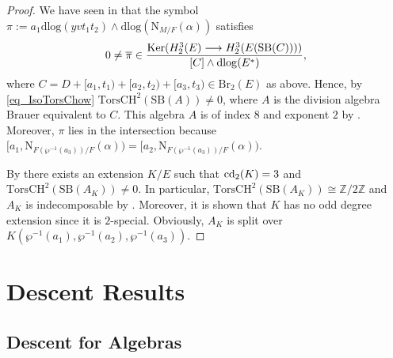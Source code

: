 \documentclass{amsart}
\newtheorem{proposition}[definition]{Proposition}
\numberwithin{equation}{section}
\newcommand{\Z}{\mathbb{Z}}
\newcommand{\BrTwo}{\mathrm{Br}_2}
\newcommand{\norm}{\mathrm{N}}
\newcommand{\dlog}{\mathrm{dlog}}
\newcommand{\torsChow}{\mathrm{Tors CH}^2}
\newcommand{\SevBrauer}{\mathrm{SB}}
\begin{document}
\begin{proof}
	We have seen in  that the symbol $\pi:=a_1\dlog(yvt_1t_2)\wedge \dlog(\norm_{M/F}(\alpha))$ satisfies 
	\[\displaystyle{0\neq  \overline{\pi}\in \frac{{\rm Ker}(H^3_2(E)\longrightarrow H^3_2({E(\SevBrauer(C))}))}{[C]\wedge \dlog(E^*)}},\]
	where $C =  D + [a_1, t_1) + [a_2, t_2) + [a_3,t_3) \in \BrTwo(E)$ as above.
	Hence, by \eqref{eq_IsoTorsChow} $\torsChow(\SevBrauer(A))\neq 0$, where $A$ is the division algebra Brauer equivalent to $C$. 
	This algebra $A$ is of index $8$ and exponent $2$ by . 
	Moreover, $\pi$ lies in the intersection because $[a_1, \norm_{F(\wp^{-1}(a_3))/F}(\alpha)) = [a_2, \norm_{F(\wp^{-1}(a_3))/F}(\alpha))$.

	By \cite[Theorem 4.1]{BarryChapmanLaghribi_DescentBiquaternion} there exists an extension $K/E$ such that ${\rm cd}_2(K)=3$ and $\torsChow(\SevBrauer(A_K))\neq 0$. 
	In particular, $\torsChow(\SevBrauer(A_K))\cong \Z/2\Z$ and $A_K$ is indecomposable by \cite[Proposition 5.3]{Karpenko_Codim2Cycles}.
	Moreover, it is shown that $K$ has no odd degree extension since it is $2$-special. 
	Obviously, $A_K$ is split over $K(\wp^{-1}(a_1), \wp^{-1}(a_2), \wp^{-1}(a_3))$.
\end{proof}





%
%


\section{Descent Results} \label{sec_Descent}

\subsection*{Descent for Algebras} %
\end{document}
